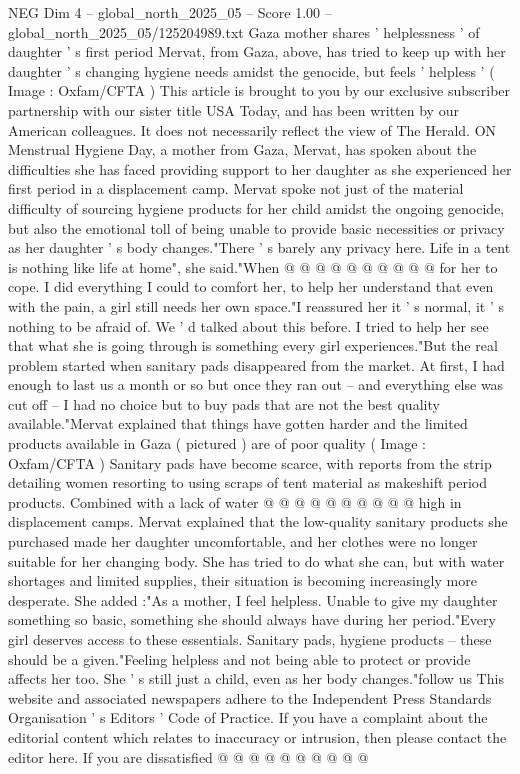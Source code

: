 \begin{textsample}{NEG Dim 4 – global\_north\_2025\_05 – Score 1.00 – global\_north\_2025\_05/125204989.txt}  \label{ex:f4_neg_270}
Gaza mother shares ' helplessness ' of daughter ' s first period Mervat, from Gaza, above, has tried to keep up with her daughter ' s changing hygiene needs amidst the genocide, but feels ' helpless ' ( Image : Oxfam/CFTA ) This article is brought to you by our exclusive subscriber partnership with our sister title USA Today, and has been written by our American colleagues.
It does not necessarily reflect the view of The Herald.
ON Menstrual Hygiene Day, a mother from Gaza, Mervat, has spoken about the difficulties she has faced providing support to her daughter as she experienced her first period in a displacement camp.
Mervat spoke not just of the material difficulty of sourcing hygiene products for her child amidst the ongoing genocide, but also the emotional toll of being unable to provide basic necessities or privacy as her daughter ' s body changes."There ' s barely any privacy here.
Life in a tent is nothing like life at home", she said."When @ @ @ @ @ @ @ @ @ @ for her to cope.
I did everything I could to comfort her, to help her understand that even with the pain, a girl still needs her own space."I reassured her it ' s normal, it ' s nothing to be afraid of.
We ' d talked about this before.
I tried to help her see that what she is going through is something every girl experiences."But the real problem started when sanitary pads disappeared from the market.
At first, I had enough to last us a month or so but once they ran out -- and everything else was cut off -- I had no choice but to buy pads that are not the best quality available."Mervat explained that things have gotten harder and the limited products available in Gaza ( pictured ) are of poor quality ( Image : Oxfam/CFTA ) Sanitary pads have become scarce, with reports from the strip detailing women resorting to using scraps of tent material as makeshift period products.
Combined with a lack of water @ @ @ @ @ @ @ @ @ @ high in displacement camps.
Mervat explained that the low-quality sanitary products she purchased made her daughter uncomfortable, and her clothes were no longer suitable for her changing body.
She has tried to do what she can, but with water shortages and limited supplies, their situation is becoming increasingly more desperate.
She added :"As a mother, I feel helpless.
Unable to give my daughter something so basic, something she should always have during her period."Every girl deserves access to these essentials.
Sanitary pads, hygiene products -- these should be a given."Feeling helpless and not being able to protect or provide affects her too.
She ' s still just a child, even as her body changes."follow us This website and associated newspapers adhere to the Independent Press Standards Organisation ' s Editors ' Code of Practice.
If you have a complaint about the editorial content which relates to inaccuracy or intrusion, then please contact the editor here.
If you are dissatisfied @ @ @ @ @ @ @ @ @ @

\end{textsample}
